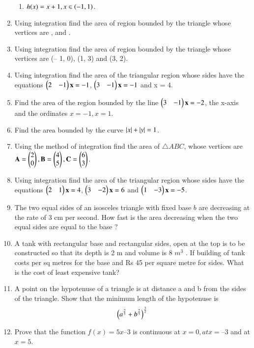 \begin{enumerate}[label=\arabic*.,ref=\thesubsection.\theenumi]
\begin{enumerate}
\item $h(x) = x+1, x \in \left(-1,1\right)$.
\end{enumerate}
%
\item Using integration find the area of region bounded by the triangle whose vertices are ,  and .
%
\item  Using integration find the area of region bounded by the triangle whose vertices are (– 1, 0), (1, 3) and (3, 2).
\item  Using integration find the area of the triangular region whose sides have the equations $\begin{pmatrix}2 & -1 \end{pmatrix}\mathbf{x} = -1$, $\begin{pmatrix}3 & -1 \end{pmatrix}\mathbf{x} = -1$ and x = 4.
%
\item Find the area of the region bounded by the line $\begin{pmatrix}3 & -1\end{pmatrix}\mathbf{x} = -2$, the x-axis and the ordinates $x = -1, x = 1$.
\item Find the area bounded by the curve $\left\vert x\right\vert+\left\vert y\right\vert = 1$.
\item Using the method of integration find the area of $\triangle ABC$, whose vertices are $\mathbf{A} = \begin{pmatrix} 2\\0 \end{pmatrix}, \mathbf{B} = \begin{pmatrix} 4\\5 \end{pmatrix}, \mathbf{C} = \begin{pmatrix} 6\\3 \end{pmatrix}$.
\item  Using integration find the area of the triangular region whose sides have the equations $\begin{pmatrix}2 & 1 \end{pmatrix}\mathbf{x} = 4$, $\begin{pmatrix}3 & -2 \end{pmatrix}\mathbf{x} = 6$ and  $\begin{pmatrix}1 & -3 \end{pmatrix}\mathbf{x} = -5$.
\item The two equal sides of an isosceles triangle with fixed base $b$ are decreasing at the rate of 3 cm per second. How fast is the area decreasing when the two equal sides are equal to the base ?
\item A tank with rectangular base and rectangular sides, open at the top is to be constructed so that its depth is 2 m and volume is 8 $m^3$
. If building of tank costs
 per sq metres for the base and Rs 45 per square metre for sides. What is the cost of least expensive tank?
\item A point on the hypotenuse of a triangle is at distance a and b from the sides of the triangle.
Show that the minimum length of the hypotenuse is
%
\begin{align}
\left(a^{\frac{2}{3}}+b^{\frac{2}{3}}\right)^{\frac{3}{2}}
\end{align}
%
\item Prove that the function $f(x) = 5x – 3$ is continuous at $x = 0, at x = – 3$ and at $x = 5$.

\end{enumerate}
